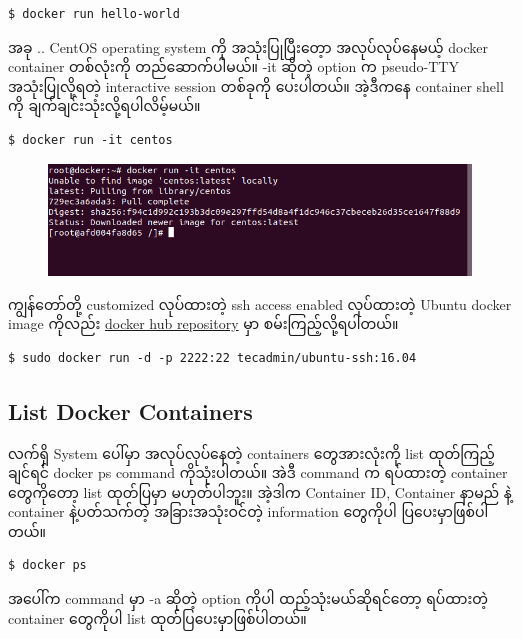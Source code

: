 \documentclass{article}
\begin{document}
\begin{verbatim}
$ docker run hello-world
\end{verbatim}

အခု .. CentOS operating system ကို အသုံးပြုပြီးတေ့ာ အလုပ်လုပ်နေမယ့်
docker container တစ်လုံးကို တည်ဆောက်ပါမယ်။ -it ဆိုတဲ့ option က
pseudo-TTY အသုံးပြုလို့ရတဲ့ interactive session တစ်ခုကို ပေးပါတယ်။
အဲ့ဒီကနေ container shell ကို ချက်ချင်းသုံးလို့ရပါလိမ့်မယ်။

\begin{verbatim}
$ docker run -it centos
\end{verbatim}

\begin{figure}[htbp]
\centering
\includegraphics[width=0.70\paperwidth]{.gitbook/assets/2_run_ti_centos.png}
\end{figure}

ကျွန်တော်တို့ customized လုပ်ထားတဲ့ ssh access enabled လုပ်ထားတဲ့ Ubuntu
docker image ကိုလည်း
\href{https://hub.docker.com/r/tecadmin/ubuntu-ssh/}{docker hub
repository} မှာ စမ်းကြည့်လို့ရပါတယ်။

\begin{verbatim}
$ sudo docker run -d -p 2222:22 tecadmin/ubuntu-ssh:16.04
\end{verbatim}

\subsection{List Docker Containers}\label{list-docker-containers}

လက်ရှိ System ပေါ်မှာ အလုပ်လုပ်နေတဲ့ containers တွေအားလုံးကို list
ထုတ်ကြည့်ချင်ရင် docker ps command ကိုသုံးပါတယ်။ အဲဒီ command က
ရပ်ထားတဲ့ container တွေကိုတော့ list ထုတ်ပြမှာ မဟုတ်ပါဘူး။ အဲ့ဒါက
Container ID, Container နာမည် နဲ့ container နဲ့ပတ်သက်တဲ့
အခြားအသုံးဝင်တဲ့ information တွေကိုပါ ပြပေးမှာဖြစ်ပါတယ်။

\begin{verbatim}
$ docker ps
\end{verbatim}

အပေါ်က command မှာ -a ဆိုတဲ့ option ကိုပါ ထည့်သုံးမယ်ဆိုရင်တော့
ရပ်ထားတဲ့ container တွေကိုပါ list ထုတ်ပြပေးမှာဖြစ်ပါတယ်။
\end{document}
